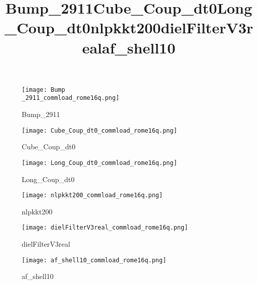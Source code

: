 \begin{figure}[H]
    \title{Bump\_2911}
    \begin{center}
        \texttt{[image: Bump\\\_2911\_commload\_rome16q.png]}
    \end{center}
    \caption{Bump\_2911}
    \label{fig:Bump_2911_rome16q_commload_single.png}
\end{figure}

\begin{figure}[H]
    \title{Cube\_Coup\_dt0}
    \begin{center}
        \texttt{[image: Cube\_Coup\_dt0\_commload\_rome16q.png]}
    \end{center}
    \caption{Cube\_Coup\_dt0}
    \label{fig:Cube_Coup_dt0_commload_rome16q.png}
\end{figure}

\begin{figure}[H]
    \title{Long\_Coup\_dt0}
    \begin{center}
        \texttt{[image: Long\_Coup\_dt0\_commload\_rome16q.png]}
    \end{center}
    \caption{Long\_Coup\_dt0}
    \label{fig:Long_Coup_dt0_commload_rome16q.png}
\end{figure}

\begin{figure}[H]
    \title{nlpkkt200}
    \begin{center}
        \texttt{[image: nlpkkt200\_commload\_rome16q.png]}
    \end{center}
    \caption{nlpkkt200}
    \label{fig:nlpkkt200_rome16q_commload_single.png}
\end{figure}

\begin{figure}[H]
    \title{dielFilterV3real}
    \begin{center}
        \texttt{[image: dielFilterV3real\_commload\_rome16q.png]}
    \end{center}
    \caption{dielFilterV3real}
    \label{fig:dielFilterV3real_commload_rome16q.png}
\end{figure}

\begin{figure}[H]
    \title{af\_shell10}
    \begin{center}
        \texttt{[image: af\_shell10\_commload\_rome16q.png]}
    \end{center}
    \caption{af\_shell10}
    \label{fig:af_shell10_rome16q_commload_single.png}
\end{figure}

